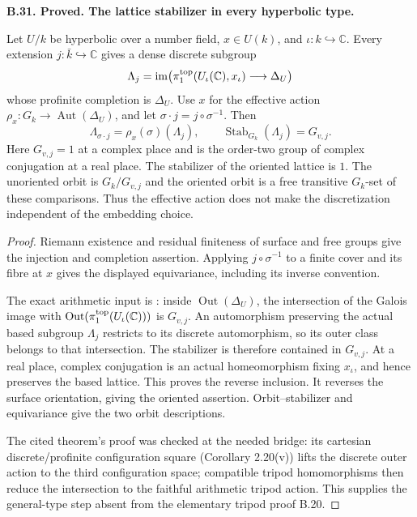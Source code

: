 \documentclass[11pt,oneside]{article}
\makeatletter
\newcounter{statementanchor}
\newenvironment{statement}[3]{%
 \refstepcounter{statementanchor}\def\@currentlabel{#1}%
 \par\addvspace{9pt}\noindent
 \textbf{#1. #2. #3.}\par\nobreak\noindent\ignorespaces
}{\par\addvspace{5pt}}
\makeatother
\begin{document}
\begin{statement}{B.31}{Proved}{The lattice stabilizer in every hyperbolic type}
\label{st:B.31}

Let $U/k$ be hyperbolic over a number field, $x\in U(k)$, and
$\iota:k\hookrightarrow\mathbb C$.  Every extension
$j:\bar k\hookrightarrow\mathbb C$ gives a dense discrete subgroup
\[
 \Lambda_j=\operatorname{im}\bigl(
 \pi_1^{\rm top}(U_\iota(\mathbb C),x_\iota)
       \longrightarrow\Delta_U\bigr)
\]
whose profinite completion is $\Delta_U$.
Use $x$ for the effective action $\rho_x:G_k\to\operatorname{Aut}(\Delta_U)$,
and let $\sigma\cdot j=j\circ\sigma^{-1}$.  Then
\[
 \Lambda_{\sigma\cdot j}=\rho_x(\sigma)(\Lambda_j),\qquad
 \operatorname{Stab}_{G_k}(\Lambda_j)=G_{v,j}.
\]
Here $G_{v,j}=1$ at a complex place and is the order-two group of
complex conjugation at a real place.  The stabilizer of the oriented
lattice is $1$.  The unoriented orbit is $G_k/G_{v,j}$ and the
oriented orbit is a free transitive $G_k$-set of these comparisons.
Thus the effective action does not make the discretization
independent of the embedding choice.
\end{statement}
\begin{proof}
Riemann existence and residual finiteness of surface and free
groups give the injection and completion assertion.  Applying
$j\circ\sigma^{-1}$ to a finite cover and its fibre at $x$ gives
the displayed equivariance, including its inverse convention.

The exact arithmetic input is
\cite[Corollary 2.25]{B_HoshiMochizukiIV}:
inside $\operatorname{Out}(\Delta_U)$, the intersection of the
Galois image with
$\operatorname{Out}(\pi_1^{\rm top}(U_\iota(\mathbb C)))$ is $G_{v,j}$.
An automorphism preserving the actual based subgroup $\Lambda_j$
restricts to its discrete automorphism, so its outer class belongs
to that intersection.  The stabilizer is therefore contained in
$G_{v,j}$.  At a real place, complex conjugation is an actual
homeomorphism fixing $x_\iota$, and hence preserves the based lattice.
This proves the reverse inclusion.  It reverses the surface
orientation, giving the oriented assertion.  Orbit--stabilizer
and equivariance give the two orbit descriptions.

The cited theorem's proof was checked at the needed bridge:
its cartesian discrete/profinite configuration square
(Corollary 2.20(v)) lifts the discrete outer action to the third
configuration space; compatible tripod homomorphisms then reduce
the intersection to the faithful arithmetic tripod action.
This supplies the general-type step absent from the elementary
tripod proof B.20.
\end{proof}
\end{document}
